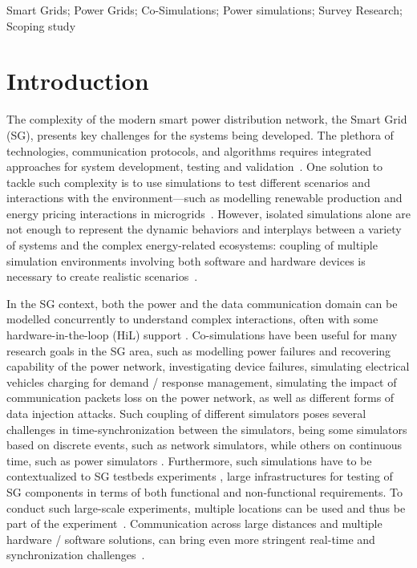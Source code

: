\documentclass[1p]{elsarticle} %
\begin{document}
\begin{frontmatter}
\begin{abstract}
\end{abstract}

\begin{keyword}
Smart Grids; Power Grids; Co-Simulations; Power simulations; Survey Research; Scoping study
\end{keyword}

\end{frontmatter}

\section{Introduction}
The complexity of the modern smart power distribution network, the Smart Grid (SG), presents key challenges for the systems being developed. The plethora of technologies, communication protocols, and algorithms requires integrated approaches for system development, testing and validation~\citep{ref:buscher2015using}. %
One solution to tackle such complexity is to use simulations to test different scenarios and interactions with the environment---such as modelling renewable production and energy pricing interactions in microgrids~\citep{ref:luo2018distributed,ref:hwang2017energy}. However, isolated simulations alone are not enough to represent the dynamic behaviors and interplays between a variety of systems and the complex energy-related ecosystems: coupling of multiple simulation environments involving both software and hardware devices is necessary to create realistic scenarios~\citep{ref:besanger2017using, ref:vogt2018survey}.


In the SG context, both the power and the data communication domain can be modelled concurrently to understand complex interactions, often with some hardware-in-the-loop (HiL) support \citep{ref:li2014simulation-review}. Co-simulations have been useful for many research goals in the SG area, such as modelling power failures and recovering capability of the power network, investigating device failures, simulating electrical vehicles charging for demand / response management, simulating the impact of communication packets loss on the power network, as well as different forms of data injection attacks. Such coupling of different simulators poses several challenges in time-synchronization between the simulators, being some simulators based on discrete events, such as network simulators, while others on continuous time, such as power simulators \citep{ref:vogt2018survey}. Furthermore, such simulations have to be contextualized to SG testbeds experiments \citep{ref:cintuglu2017survey}, large infrastructures for testing of SG components in terms of both functional and non-functional requirements. To conduct such large-scale experiments, multiple locations can be used and thus be part of the experiment~\citep{ref:buscher2015using}.  Communication across large distances and multiple hardware / software solutions, can bring even more stringent real-time and synchronization challenges~\citep{ref:buscher2015using}.  
\end{document}
